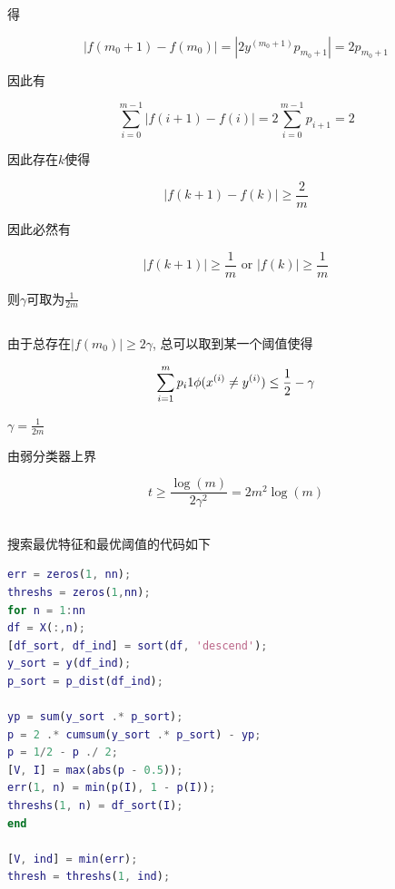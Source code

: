 \documentclass{ctexart}
\begin{document}
得

\begin{equation}
	|f(m_0 + 1) - f(m_0)| = |2 y^{(m_0 + 1)} p_{m_0 + 1}| = 2p_{m_0 + 1}
\end{equation}

因此有

\begin{equation}
	\sum_{i=0}^{m-1} |f(i+1) - f(i)| = 2\sum_{i=0}^{m-1} p_{i+1} = 2
\end{equation}

因此存在$k$使得

\begin{equation*}
	|f(k+1) - f(k)| \ge \frac{2}{m}
\end{equation*}

因此必然有

\begin{equation*}
	|f(k+1)| \ge \frac{1}{m}  \text{  or  } |f(k)| \ge \frac{1}{m}
\end{equation*}

则$\gamma$可取为$\frac{1}{2m}$

\subsection{}

由于总存在$|f(m_0)| \ge 2 \gamma$, 总可以取到某一个阈值使得

\begin{equation}
	\sum_{i = 1}^{m} p_i 1{\phi(x^{(i)} \ne y^{(i)})} \le \frac{1}{2} - \gamma \notag
\end{equation}

$\gamma = \frac{1}{2m}$

由弱分类器上界

\begin{equation}
	t \ge \frac{\log(m)}{2 \gamma^2} = 2m^2 \log(m)
\end{equation}

\subsection{}

搜索最优特征和最优阈值的代码如下

\begin{lstlisting}[language = MATLAB]
err = zeros(1, nn);
threshs = zeros(1,nn);
for n = 1:nn
df = X(:,n);
[df_sort, df_ind] = sort(df, 'descend');
y_sort = y(df_ind);
p_sort = p_dist(df_ind);

yp = sum(y_sort .* p_sort);
p = 2 .* cumsum(y_sort .* p_sort) - yp;
p = 1/2 - p ./ 2;
[V, I] = max(abs(p - 0.5));
err(1, n) = min(p(I), 1 - p(I));
threshs(1, n) = df_sort(I);
end

[V, ind] = min(err);
thresh = threshs(1, ind);	
\end{lstlisting}
\end{document}
